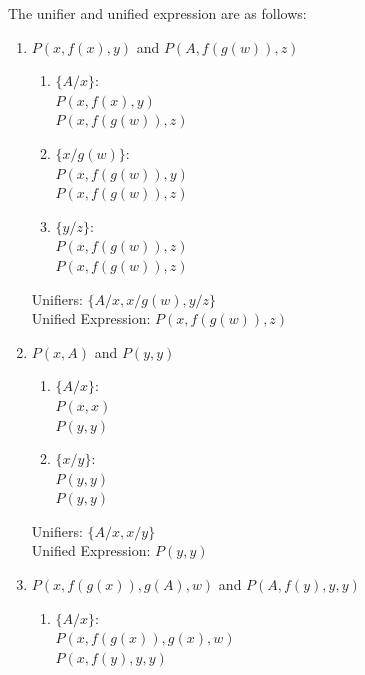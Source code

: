 \documentclass[12pt]{article}
\begin{document}
\solution The unifier and unified expression are as follows:
\begin{enumerate}
    \item $P(x,f(x),y)$ and $P(A,f(g(w)),z)$
          \begin{enumerate}[(1)]
              \item $\{A/x\}$:\\
                    $P(x,f(x),y)$\\
                    $P(x,f(g(w)),z)$

              \item $\{x/g(w)\}$:\\
                    $P(x,f(g(w)),y)$\\
                    $P(x,f(g(w)),z)$

              \item $\{y/z\}$:\\
                    $P(x,f(g(w)),z)$\\
                    $P(x,f(g(w)),z)$
          \end{enumerate}

          \noindent
          Unifiers: $\{A/x,x/g(w),y/z\}$\\
          Unified Expression: $P(x,f(g(w)),z)$

          \newpage
    \item $P(x,A)$ and $P(y,y)$
          \begin{enumerate}[(1)]
              \item $\{A/x\}$:\\
                    $P(x,x)$\\
                    $P(y,y)$

              \item $\{x/y\}$:\\
                    $P(y,y)$\\
                    $P(y,y)$
          \end{enumerate}

          \noindent
          Unifiers: $\{A/x,x/y\}$\\
          Unified Expression: $P(y,y)$

    \item $P(x,f(g(x)),g(A),w)$ and $P(A,f(y),y,y)$
          \begin{enumerate}
              \item $\{A/x\}$:\\
                    $P(x,f(g(x)),g(x),w)$\\
                    $P(x,f(y),y,y)$


\end{enumerate}
\end{enumerate}
\end{document}
